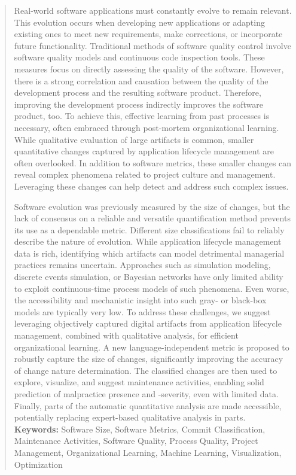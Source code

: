 \begin{abstract}
Real-world software applications must constantly evolve to remain relevant. This evolution occurs when developing new applications or adapting existing ones to meet new requirements, make corrections, or incorporate future functionality.
Traditional methods of software quality control involve software quality models and continuous code inspection tools. These measures focus on directly assessing the quality of the software.
However, there is a strong correlation and causation between the quality of the development process and the resulting software product.
Therefore, improving the development process indirectly improves the software product, too.
To achieve this, effective learning from past processes is necessary, often embraced through post-mortem organizational learning.
While qualitative evaluation of large artifacts is common, smaller quantitative changes captured by application lifecycle management are often overlooked.
In addition to software metrics, these smaller changes can reveal complex phenomena related to project culture and management.
Leveraging these changes can help detect and address such complex issues.


Software evolution was previously measured by the size of changes, but the lack of consensus on a reliable and versatile quantification method prevents its use as a dependable metric.
Different size classifications fail to reliably describe the nature of evolution. While application lifecycle management data is rich, identifying which artifacts can model detrimental managerial practices remains uncertain.
Approaches such as simulation modeling, discrete events simulation, or Bayesian networks have only limited ability to exploit continuous-time process models of such phenomena.
Even worse, the accessibility and mechanistic insight into such gray- or black-box models are typically very low.
To address these challenges, we suggest leveraging objectively captured digital artifacts from application lifecycle management, combined with qualitative analysis, for efficient organizational learning.
A new language-independent metric is proposed to robustly capture the size of changes, significantly improving the accuracy of change nature determination.
The classified changes are then used to explore, visualize, and suggest maintenance activities, enabling solid prediction of malpractice presence and -severity, even with limited data.
Finally, parts of the automatic quantitative analysis are made accessible, potentially replacing expert-based qualitative analysis in parts.
%
%
\bigskip
\vfill
\noindent
\textbf{Keywords:}
Software Size, Software Metrics, Commit Classification, Maintenance Activities, Software Quality, Process Quality, Project Management, Organizational Learning, Machine Learning, Visualization, Optimization

\end{abstract}
\cleardoublepage
